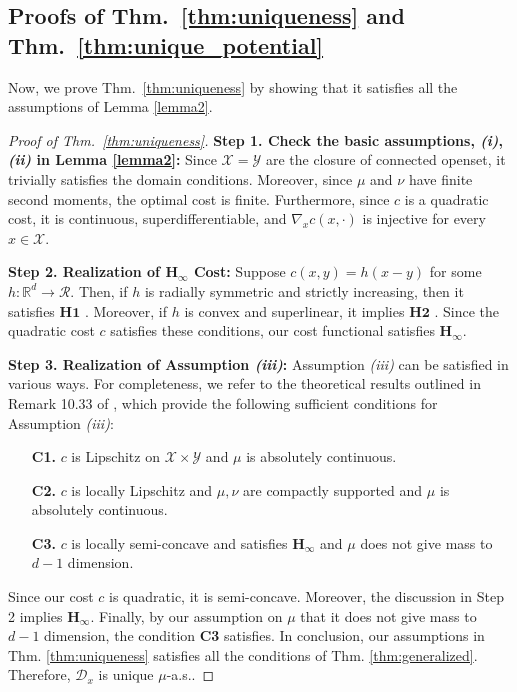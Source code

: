 \subsection{Proofs of Thm.~\ref{thm:uniqueness} and Thm.~\ref{thm:unique_potential}}

Now, we prove Thm.~\ref{thm:uniqueness} by showing that it satisfies all the assumptions of Lemma \ref{lemma2}.

\begin{proof}[Proof of Thm.~\ref{thm:uniqueness}]
\textbf{Step 1. Check the basic assumptions, \textit{(i)}, \textit{(ii)} in Lemma \ref{lemma2}:}
Since $\mathcal{X}=\mathcal{Y}$ are the closure of connected openset, it trivially satisfies the domain conditions.
Moreover, since $\mu$ and $\nu$ have finite second moments, the optimal cost is finite. Furthermore, since $c$ is a quadratic cost, it is continuous, superdifferentiable, and $\nabla_x c (x, \cdot)$ is injective for every $x\in\mathcal{X}$.

\textbf{Step 2. Realization of $\mathbf{H_\infty}$ Cost:}
Suppose $c(x,y) = h(x-y)$ for some $h:\mathbb{R}^d \rightarrow \mathcal{R}$. Then, if $h$ is radially symmetric and strictly increasing, then it satisfies $\mathbf{H1}$ \cite{gangbo1996geometry}.
Moreover, if $h$ is convex and superlinear, it implies $\mathbf{H2}$ \cite{gangbo1996geometry}. Since the quadratic cost $c$ satisfies these conditions, our cost functional satisfies $\mathbf{H_\infty}$.

\textbf{Step 3. Realization of Assumption \textit{(iii)}:} 
Assumption \textit{(iii)} can be satisfied in various ways. For completeness, we refer to the theoretical results outlined in Remark 10.33 of \citet{villani}, which provide the following sufficient conditions for Assumption \textit{(iii)}:
\begin{enumerate}
    \item[\textbf{C1.}] $c$ is Lipschitz on $\mathcal{X}\times \mathcal{Y}$ and $\mu$ is absolutely continuous.
    \item[\textbf{C2.}] $c$ is locally Lipschitz and $\mu, \nu$ are compactly supported and $\mu$ is absolutely continuous.
    \item[\textbf{C3.}] $c$ is locally semi-concave and satisfies $\mathbf{H_\infty}$ and $\mu$ does not give mass to $d-1$ dimension.
\end{enumerate}
Since our cost $c$ is quadratic, it is semi-concave. Moreover, the discussion in Step 2 implies $\mathbf{H_\infty}$. Finally, by our assumption on $\mu$ that it does not give mass to $d-1$ dimension, the condition \textbf{C3} satisfies. 
In conclusion, our assumptions in Thm. \ref{thm:uniqueness} satisfies all the conditions of Thm. \ref{thm:generalized}. Therefore, $\mathcal{D}_x$ is unique $\mu$-a.s..
\end{proof}

